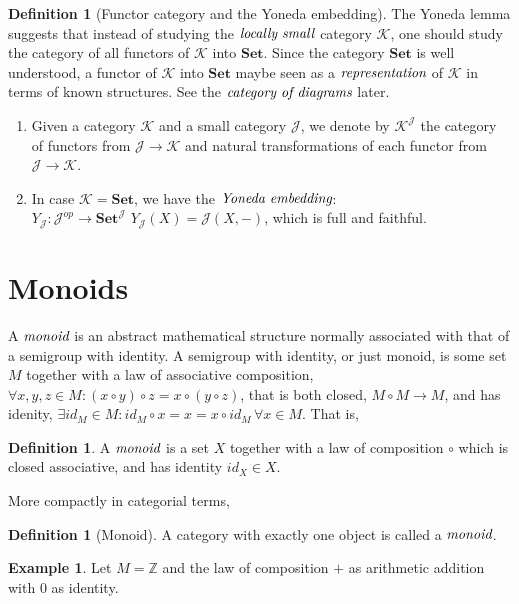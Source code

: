 \documentclass[10pt, oneside, reqno]{amsart}
\theoremstyle{plain}%
\theoremstyle{definition}
\newtheorem{defn}[thm]{Definition}
\newtheorem{exmp}[thm]{Example}
\theoremstyle{remark}
\newcommand{\Z}{\mathbb{Z}}
\newcommand{\Id}{\mathit{id}_}
\begin{document}
\begin{defn}[Functor category and the Yoneda embedding]
The Yoneda lemma suggests that instead of studying the $\emph{locally small}$ category $\mathcal{K}$,
one should study the category of all functors of $\mathcal{K}$ into $\textbf{Set}$.
Since the category $\textbf{Set}$ is well understood, a functor of $\mathcal{K}$ into $\textbf{Set}$
maybe seen as a $\emph{representation}$ of $\mathcal{K}$ in terms of known structures.
See the $\emph{category of diagrams}$ later.
 \begin{enumerate}
  \item Given a category $\mathcal{K}$ and a small category $\mathcal{J}$, we denote by
  $\mathcal{K}^\mathcal{J}$ the category of functors from $\mathcal{J} \to \mathcal{K}$ and natural transformations
  of each functor from $\mathcal{J} \to \mathcal{K}$.
  \item In case $\mathcal{K} = \textbf{Set}$, we have the $\emph{Yoneda embedding}$:\\
  $Y_{\mathcal{J}}: \mathcal{J}^{op} \to \textbf{Set}^{\mathcal{J}}
  \, \,
  Y_{\mathcal{J}}(X) = \mathcal{J}(X, -)$, which is full and faithful.
 \end{enumerate}
\end{defn}


\section{Monoids} %
\label{sec:monoids}
A $\emph{monoid}$ is an abstract mathematical structure normally associated with that of a semigroup with identity.
A semigroup with identity, or just monoid, is some set $M$ together with a law of associative composition,
$\forall x,y,z \in M : (x \circ y) \circ z = x \circ (y \circ z)$, that is both closed, $M \circ M \to M$,
and has idenity, $\exists \Id{M} \in M : \Id{M} \circ x = x = x \circ \Id{M} \, \forall x \in M$. That is,

\begin{defn}
 A $\emph{monoid}$ is a set $X$ together with a law of composition $\circ$
 which is closed associative, and has identity $\Id{X} \in X$.
\end{defn}

More compactly in categorial terms,
\begin{defn}[Monoid]
 A category with exactly one object is called a $\emph{monoid}$.
\end{defn}

\begin{exmp}
 Let $M = \Z$ and the law of composition $+$ as arithmetic addition with $0$ as identity.
\end{exmp}
\end{document}
